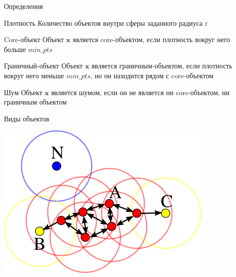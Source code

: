 \documentclass[10pt,a4paper]{beamer}
\begin{document}
\begin{frame}{Определения}

\begin{block}{Плотность}
Количество объектов внутри сферы заданного радиуса $\varepsilon$
\end{block}

\begin{block}{Core-объект}
Объект $\mathbf{x}$ является core-объектом, если плотность вокруг него больше $min\_pts$
\end{block}

\begin{block}{Граничный-объект}
Объект $\mathbf{x}$ является граничным-объектом, если плотность вокруг него меньше $min\_pts$, но он находится рядом с core-объектом
\end{block}

\begin{block}{Шум}
Объект $\mathbf{x}$ является шумом, если он не является ни core-объектом, ни граничным объектом
\end{block}

\end{frame}


\begin{frame}{Виды объектов}

\begin{center}
\includegraphics[scale=0.5]{images/points.png}
\end{center}

\end{frame}

\end{document}
